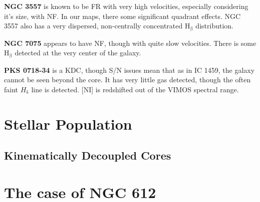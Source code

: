 		\textbf{NGC 3557} is known to be FR with very high velocities, especially considering it's size, with NF. In our maps, there some significant quadrant effects. NGC 3557 also has a very dispersed, non-centrally concentrated H$_\mathrm{\beta}$ distribution. 

		\textbf{NGC 7075} appears to have NF, though with quite slow velocities. There is some H$_\mathrm{\beta}$ detected at the very center of the galaxy. 

		\textbf{PKS 0718-34} is a KDC, though S/N issues mean that as in IC 1459, the galaxy cannot be seen beyond the core. It has very little gas detected, though the often faint $H_\mathrm{\delta}$ line is detected. [NI] is redshifted out of the VIMOS spectral range.

		








\section{Stellar Population}
	\label{sec:pop}




	\subsection{Kinematically Decoupled Cores}
		\label{sec:popKDC}

	\section{The case of NGC 612}
		\label{sec:NGC612}